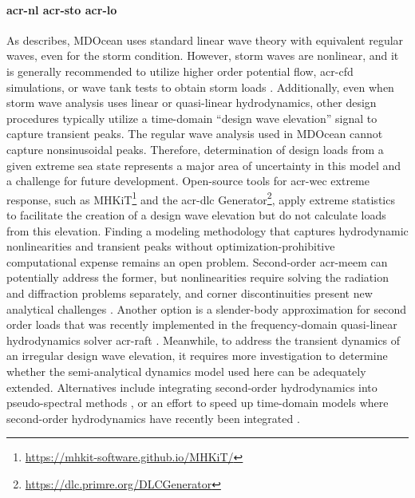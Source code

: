     \paragraph{\gls{acr-nl} \gls{acr-sto} \gls{acr-lo}}
    As  describes, MDOcean uses standard linear wave theory with equivalent regular waves, even for the storm condition.
    However, storm waves are nonlinear, and it is generally recommended to utilize higher order potential flow, \gls{acr-cfd} simulations, or wave tank tests to obtain storm loads \citep{coe_survey_2018}.
    Additionally, even when storm wave analysis uses linear or quasi-linear hydrodynamics, other design procedures typically utilize a time-domain ``design wave elevation'' signal to capture transient peaks.
    The regular wave analysis used in MDOcean cannot capture nonsinusoidal peaks.
    Therefore, determination of design loads from a given extreme sea state represents a major area of uncertainty in this model and a challenge for future development.
    Open-source tools for \gls{acr-wec} extreme response, such as MHKiT\footnote{\url{https://mhkit-software.github.io/MHKiT/}} and the \gls{acr-dlc} Generator\footnote{\url{https://dlc.primre.org/DLCGenerator}}, apply extreme statistics to facilitate the creation of a design wave elevation but do not calculate loads from this elevation.
    Finding a modeling methodology that captures hydrodynamic nonlinearities and transient peaks without optimization-prohibitive computational expense remains an open problem.
    Second-order \gls{acr-meem} can potentially address the former, but nonlinearities require solving the radiation and diffraction problems separately, and corner discontinuities present new analytical challenges \citep{cong_novel_2020,mavrakos_second-order_2009}.
    Another option is a slender-body approximation for second order loads that was recently implemented in the frequency-domain quasi-linear hydrodynamics solver \gls{acr-raft} \citep{carmo_slender-body_2025}.
    Meanwhile, to address the transient dynamics of an irregular design wave elevation, it requires more investigation to determine whether the semi-analytical dynamics model used here can be adequately extended.
    Alternatives include integrating second-order hydrodynamics into pseudo-spectral methods \citep{coe_initial_2020}, or an effort to speed up time-domain models where second-order hydrodynamics have recently been integrated \citep{issoglio_second-order_2026}.
    

